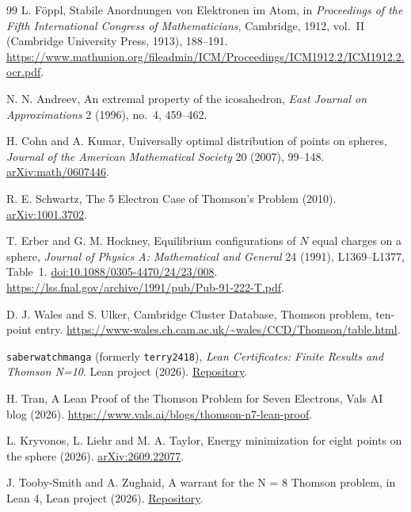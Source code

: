 \documentclass[11pt]{article}
\begin{document}
\begin{thebibliography}{99}
L. F\"oppl, Stabile Anordnungen von Elektronen im Atom,
in \emph{Proceedings of the Fifth International Congress of Mathematicians},
Cambridge, 1912, vol.~II (Cambridge University Press, 1913), 188--191.
\url{https://www.mathunion.org/fileadmin/ICM/Proceedings/ICM1912.2/ICM1912.2.ocr.pdf}.

N. N. Andreev, An extremal property of the icosahedron,
\emph{East Journal on Approximations} 2 (1996), no.~4, 459--462.

H. Cohn and A. Kumar, Universally optimal distribution of points on spheres,
\emph{Journal of the American Mathematical Society} 20 (2007), 99--148.
\href{https://arxiv.org/abs/math/0607446v2}{arXiv:math/0607446}.

R. E. Schwartz, The 5 Electron Case of Thomson's Problem (2010).
\href{https://arxiv.org/abs/1001.3702v5}{arXiv:1001.3702}.

T. Erber and G. M. Hockney, Equilibrium configurations of $N$ equal charges
on a sphere, \emph{Journal of Physics A: Mathematical and General}
24 (1991), L1369--L1377, Table~1.
\href{https://doi.org/10.1088/0305-4470/24/23/008}{doi:10.1088/0305-4470/24/23/008}.
\url{https://lss.fnal.gov/archive/1991/pub/Pub-91-222-T.pdf}.

D. J. Wales and S. Ulker, Cambridge Cluster Database, Thomson problem,
ten-point entry.
\url{https://www-wales.ch.cam.ac.uk/~wales/CCD/Thomson/table.html}.

\texttt{saberwatchmanga} (formerly \texttt{terry2418}),
\emph{Lean Certificates: Finite Results and Thomson N=10}.
Lean project (2026).
\href{https://github.com/saberwatchmanga/-lean-finite-certificates/blob/7ba9eb38db36c9cb957ff26758b66bbacc31d8bc/README.md}{Repository}.

H. Tran, A Lean Proof of the Thomson Problem for Seven Electrons,
Vals AI blog (2026).
\url{https://www.vals.ai/blogs/thomson-n7-lean-proof}.

L. Kryvonos, L. Liehr and M. A. Taylor, Energy minimization for eight
points on the sphere (2026).
\href{https://arxiv.org/abs/2609.22077v1}{arXiv:2609.22077}.

J. Tooby-Smith and A. Zughaid, A warrant for the N = 8 Thomson problem, in Lean 4,
Lean project (2026).
\href{https://github.com/jstoobysmith/Thomson-N-8-Warrant/blob/2c35d62e07d72686931da4bc3e062d668e858eda/README.md}{Repository}.


\end{thebibliography}
\end{document}
